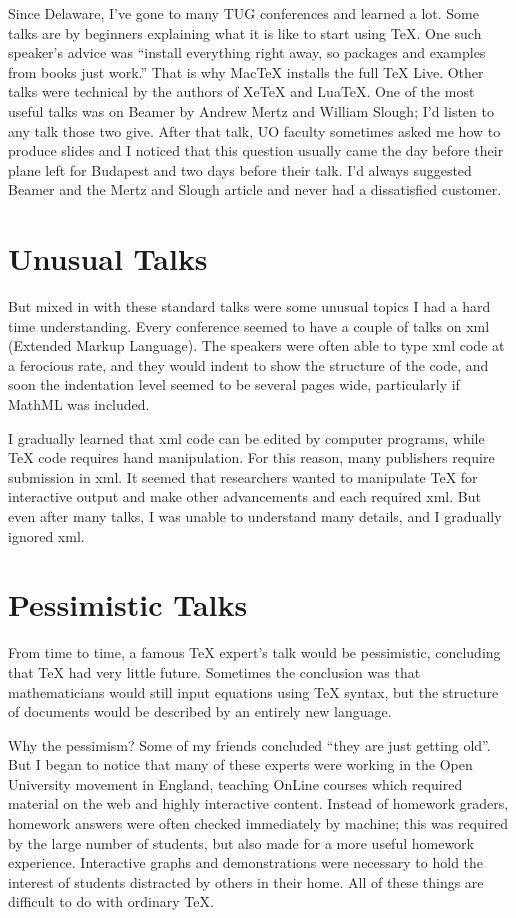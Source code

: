 \documentclass[11pt, oneside]{article}   	%
\begin{document}
Since Delaware, I've gone to many TUG conferences and learned a lot. Some talks are by beginners explaining what it is like to start using TeX. One such speaker's advice was ``install everything right away, so packages and examples from books just work.'' That is why MacTeX installs the full TeX Live. Other talks were technical by the authors of XeTeX and LuaTeX. One of the most useful talks was on Beamer by Andrew Mertz and William Slough; I'd listen to any talk those two give. After that talk, UO faculty sometimes asked me how to produce slides and I noticed that this question usually came the day before their plane left for Budapest and two days before their talk. I'd always suggested Beamer and the Mertz and Slough article and never had a dissatisfied customer.

\section{Unusual Talks}
But mixed in with these standard talks were some unusual topics I had a hard time understanding. Every conference seemed to have a couple of talks on xml (Extended Markup Language). The speakers were often
able to type xml code at a ferocious rate, and they would indent to show the structure of the code, and soon the indentation level seemed to be several pages wide, particularly if MathML was included. 

I gradually learned that xml code can be edited  by computer programs, while TeX code requires hand manipulation. For this reason, many publishers require submission in xml. It seemed that researchers wanted to manipulate TeX for interactive output and make other advancements and each required xml. But even after many talks, I was unable to understand many details, and I gradually ignored xml.

\section{Pessimistic Talks} 

From time to time, a famous TeX expert's talk would be pessimistic, concluding that TeX had very little future. Sometimes the conclusion was that mathematicians would still input equations using TeX syntax, but the structure of documents would be described by an entirely new language. 

Why the pessimism? Some of my friends concluded ``they are just getting old''. But I began to notice that many of these experts were working in the Open University movement in England, teaching OnLine courses which required material on the web and highly interactive content. Instead of homework graders, homework answers were often checked immediately by machine; this was required by the large number of students, but also made for a more useful homework experience. Interactive graphs and demonstrations were necessary to hold the interest of students distracted by others in their home. All of these things are difficult to do with ordinary TeX. 
\end{document}
